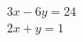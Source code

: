 \documentclass[preview]{standalone}
\begin{document}
\begin{align*}
\begin{array}{c} 3x-6y=24 \\  2x+y=1 \end{array}
\end{align*}
\end{document}
